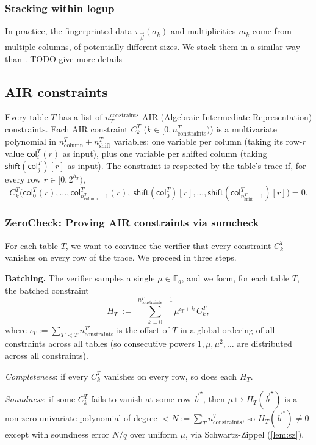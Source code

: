 \documentclass{article}
\theoremstyle{definition}
\newcommand{\Fq}{\mathbb F_q}
\begin{document}
\subsubsection{Stacking within logup}

In practice, the fingerprinted data $\pi_{\vec\beta}(\sigma_k)$ and multiplicities $m_k$ come from multiple columns, of potentially different sizes. We stack them in a similar way than . TODO give more details

\subsection{AIR constraints}

Every table $T$ has a list of $n^\text{constraints}_T$ AIR (Algebraic Intermediate Representation) constraints. Each AIR constraint $C_k^T$ ($k \in [0, n_\text{constraints}^T)$) is a multivariate polynomial in $n_\text{column}^T + n_\text{shift}^T$ variables: one variable per column (taking its row-$r$ value $\textsf{col}^T_i(r)$ as input), plus one variable per shifted column (taking $\textsf{shift}(\textsf{col}^T_j)[r]$ as input). The constraint is respected by the table's trace if, for every row $r \in [0, 2^{h_T})$,
$$
C_k^T\big(\textsf{col}^T_0(r), \ldots, \textsf{col}^T_{n_\text{column}^T-1}(r),\ \textsf{shift}(\textsf{col}^T_0)[r], \ldots, \textsf{shift}(\textsf{col}^T_{n_\text{shift}^T-1})[r]\big) = 0.
$$

\subsubsection{ZeroCheck: Proving AIR constraints via sumcheck}

For each table $T$, we want to convince the verifier that every constraint $C_k^T$ vanishes on every row of the trace. We proceed in three steps.

\textbf{Batching.} The verifier samples a single $\mu \in \Fq$, and we form, for each table $T$, the batched constraint
\[
H_T \;:=\; \sum_{k=0}^{n_\text{constraints}^T - 1} \mu^{\iota_T + k}\, C_k^T,
\]
where $\iota_T := \sum_{T' < T} n_\text{constraints}^{T'}$ is the offset of $T$ in a global ordering of all constraints across all tables (so consecutive powers $1, \mu, \mu^2, \dots$ are distributed across all constraints).

\emph{Completeness}: if every $C_k^T$ vanishes on every row, so does each $H_T$.

\emph{Soundness}: if some $C_k^T$ fails to vanish at some row $\vec b^\star$, then $\mu \mapsto H_T(\vec b^\star)$ is a non-zero univariate polynomial of degree $< N := \sum_T n_\text{constraints}^T$, so $H_T(\vec b^\star) \neq 0$ except with soundness error $N/q$ over uniform $\mu$, via Schwartz-Zippel (\cref{lem:sz}).
\end{document}

